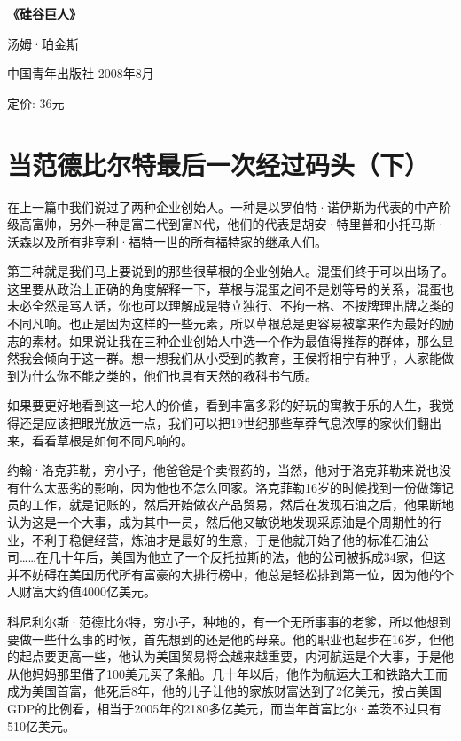 \textbf{《硅谷巨人》}

汤姆·珀金斯

中国青年出版社 2008年8月

定价: 36元

\hypertarget{ux5f53ux8303ux5fb7ux6bd4ux5c14ux7279ux6700ux540eux4e00ux6b21ux7ecfux8fc7ux7801ux5934ux4e0b}{%
\section{当范德比尔特最后一次经过码头（下）}\label{ux5f53ux8303ux5fb7ux6bd4ux5c14ux7279ux6700ux540eux4e00ux6b21ux7ecfux8fc7ux7801ux5934ux4e0b}}

在上一篇中我们说过了两种企业创始人。一种是以罗伯特·诺伊斯为代表的中产阶级高富帅，另外一种是富二代到富N代，他们的代表是胡安·特里普和小托马斯·沃森以及所有非亨利·福特一世的所有福特家的继承人们。

第三种就是我们马上要说到的那些很草根的企业创始人。混蛋们终于可以出场了。这里要从政治上正确的角度解释一下，草根与混蛋之间不是划等号的关系，混蛋也未必全然是骂人话，你也可以理解成是特立独行、不拘一格、不按牌理出牌之类的不同凡响。也正是因为这样的一些元素，所以草根总是更容易被拿来作为最好的励志的素材。如果说让我在三种企业创始人中选一个作为最值得推荐的群体，那么显然我会倾向于这一群。想一想我们从小受到的教育，王侯将相宁有种乎，人家能做到为什么你不能之类的，他们也具有天然的教科书气质。

如果要更好地看到这一坨人的价值，看到丰富多彩的好玩的寓教于乐的人生，我觉得还是应该把眼光放远一点，我们可以把19世纪那些草莽气息浓厚的家伙们翻出来，看看草根是如何不同凡响的。

约翰·洛克菲勒，穷小子，他爸爸是个卖假药的，当然，他对于洛克菲勒来说也没有什么太恶劣的影响，因为他也不怎么回家。洛克菲勒16岁的时候找到一份做簿记员的工作，就是记账的，然后开始做农产品贸易，然后在发现石油之后，他果断地认为这是一个大事，成为其中一员，然后他又敏锐地发现采原油是个周期性的行业，不利于稳健经营，炼油才是最好的生意，于是他就开始了他的标准石油公司\ldots\ldots 在几十年后，美国为他立了一个反托拉斯的法，他的公司被拆成34家，但这并不妨碍在美国历代所有富豪的大排行榜中，他总是轻松排到第一位，因为他的个人财富大约值4000亿美元。

科尼利尔斯·范德比尔特，穷小子，种地的，有一个无所事事的老爹，所以他想到要做一些什么事的时候，首先想到的还是他的母亲。他的职业也起步在16岁，但他的起点要更高一些，他认为美国贸易将会越来越重要，内河航运是个大事，于是他从他妈妈那里借了100美元买了条船。几十年以后，他作为航运大王和铁路大王而成为美国首富，他死后8年，他的儿子让他的家族财富达到了2亿美元，按占美国GDP的比例看，相当于2005年的2180多亿美元，而当年首富比尔·盖茨不过只有510亿美元。

